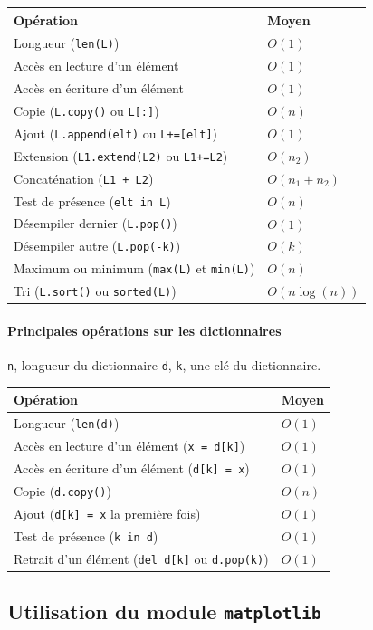 \begin{longtable}{|m{9cm}|m{2.1cm}|} \hline
	\bf \centering Opération & \bf \centering Moyen \tabularnewline
	\hline
	\endhead
	Longueur (\texttt{len(L)}) &  $O(1)$ \tabularnewline
	\hline
	Accès en lecture d'un élément &  $O(1)$ \tabularnewline
	\hline
	Accès en écriture d'un élément &  $O(1)$ \tabularnewline
	\hline
	Copie (\texttt{L.copy()} ou \texttt{L[:]}) & $O(n)$ \tabularnewline
	\hline
	Ajout (\texttt{L.append(elt)} ou \texttt{L+=[elt]}) & $O(1)$ \tabularnewline
	\hline
	Extension (\texttt{L1.extend(L2)} ou \texttt{L1+=L2}) & $O(n_2)$ \tabularnewline
	\hline
	Concaténation (\texttt{L1 + L2}) &  $O(n_1 + n_2)$ \tabularnewline
	\hline
	Test de présence (\texttt{elt in L}) & $O(n)$ \tabularnewline
	\hline
	Désempiler dernier (\texttt{L.pop()}) &  $O(1)$ \tabularnewline
	\hline
	Désempiler autre (\texttt{L.pop(-k)}) &  $O(k)$ \tabularnewline
	\hline
	Maximum ou minimum (\texttt{max(L)} et \texttt{min(L)}) &  $O(n)$ \tabularnewline
	\hline
	Tri (\texttt{L.sort()} ou \texttt{sorted(L)}) &  $O(n \log(n))$ \tabularnewline
	\hline
\end{longtable}

\paragraph*{Principales opérations sur les dictionnaires}

\texttt{n}, longueur du dictionnaire \texttt{d}, \texttt{k}, une clé du dictionnaire.

\begin{longtable}{|m{9cm}|m{2.1cm}|} \hline
	\bf \centering Opération & \bf \centering Moyen \tabularnewline
	\hline
	\endhead
	Longueur (\texttt{len(d)}) &  $O(1)$ \tabularnewline
	\hline
	Accès en lecture d'un élément (\texttt{x = d[k]})  &  $O(1)$ \tabularnewline
	\hline
	Accès en écriture d'un élément (\texttt{d[k] = x}) &  $O(1)$ \tabularnewline
	\hline
	Copie (\texttt{d.copy()}) & $O(n)$ \tabularnewline
	\hline
	Ajout (\texttt{d[k] = x} la première fois) & $O(1)$ \tabularnewline
	\hline
	Test de présence (\texttt{k in d}) & $O(1)$ \tabularnewline
	\hline
	Retrait d'un élément (\texttt{del d[k]} ou \texttt{d.pop(k)}) & $O(1)$ \tabularnewline
	\hline
\end{longtable}

\subsection*{Utilisation du module \texttt{matplotlib}}


